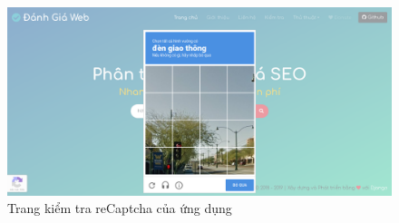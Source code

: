 \begin{center}
    \begin{figure}[!ht]
        \centering
        \includegraphics[width=120mm]{images/trang-recaptcha.png}
        \caption{Trang kiểm tra reCaptcha của ứng dụng}
    \end{figure}
\end{center}